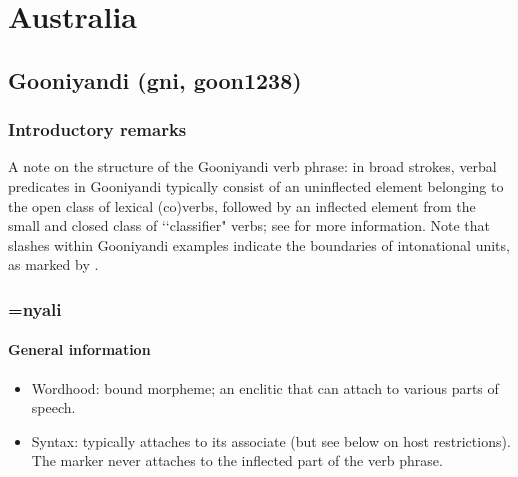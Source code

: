 \chapter{Australia}
\label{appendixAustralia}

\section{Gooniyandi (gni, goon1238)}
\label{appendixGooniyandi}

\subsection{Introductory remarks}
A note on the structure of the Gooniyandi verb phrase: in broad strokes, verbal predicates in Gooniyandi typically consist of an uninflected element belonging to the open class of lexical (co)verbs, followed by an inflected element from the small and closed class of \lq\lq classifier" verbs; see \textcite[190–227]{McGregor1990} for more information. Note that slashes within Gooniyandi examples indicate the boundaries of intonational units, as marked by \textcite{McGregor1990}.

\subsection{=nyali}
\subsubsection{General information}
\begin{itemize}
	\item Wordhood: bound morpheme; an enclitic that can attach to various parts of speech.
	\item Syntax: typically attaches to its associate (but see below on host restrictions). The marker never attaches to the inflected part of the verb phrase.
\end{itemize}

